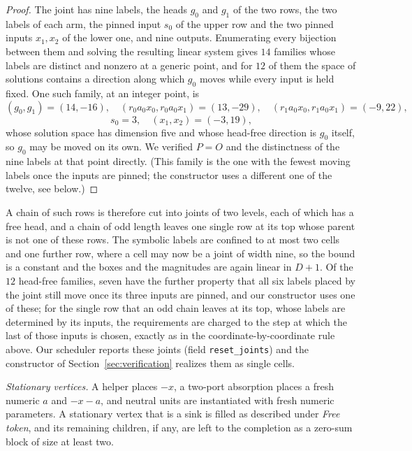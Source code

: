 \documentclass[11pt,a4paper]{article}
\theoremstyle{plain}
\theoremstyle{definition}
\theoremstyle{remark}
\begin{document}
\begin{proof}
The joint has nine labels, the heads $g_0$ and $g_1$ of the two rows, the two
labels of each arm, the pinned input $s_0$ of the upper row and the two pinned
inputs $x_1,x_2$ of the lower one, and nine outputs.  Enumerating every
bijection between them and solving the resulting linear system gives $14$
families whose labels are distinct and nonzero at a generic point, and for $12$
of them the space of solutions contains a direction along which $g_0$ moves
while every input is held fixed.  One such family, at an integer point, is
$$(g_0,g_1)=(14,-16),\quad
  (r_0a_0x_0,r_0a_0x_1)=(13,-29),\quad
  (r_1a_0x_0,r_1a_0x_1)=(-9,22),$$
$$s_0=3,\quad (x_1,x_2)=(-3,19),$$
whose solution space has dimension five and whose head-free direction is $g_0$
itself, so $g_0$ may be moved on its own.  We verified $P=O$ and the
distinctness of the nine labels at that point directly.  (This family is the
one with the fewest moving labels once the inputs are pinned; the constructor
uses a different one of the twelve, see below.)
\end{proof}

A chain of such rows is therefore cut into joints of two levels, each of which
has a free head, and a chain of odd length leaves one single row at its top
whose parent is not one of these rows.  The symbolic labels are confined to at
most two cells and one further row, where a cell may now be a joint of width
nine, so the bound is a constant and the boxes and the magnitudes are again
linear in $D+1$.  Of the $12$ head-free families, seven have the further
property that all six labels placed by the joint still move once its three
inputs are pinned, and our constructor uses one of these; for the single row
that an odd chain leaves at its top, whose labels are determined by its inputs,
the requirements are charged to the step at which the last of those inputs is
chosen, exactly as in the coordinate-by-coordinate rule above.  Our scheduler
reports these joints (field \texttt{reset\_joints}) and the constructor of
Section~\ref{sec:verification} realizes them as single cells.

\emph{Stationary vertices.}  A helper places $-x$, a two-port absorption
places a fresh numeric $a$ and $-x-a$, and neutral units are instantiated with
fresh numeric parameters.  A stationary vertex that is a sink is filled as
described under \emph{Free token}, and its remaining children, if any, are
left to the completion as a zero-sum block of size at least two.
\end{document}
